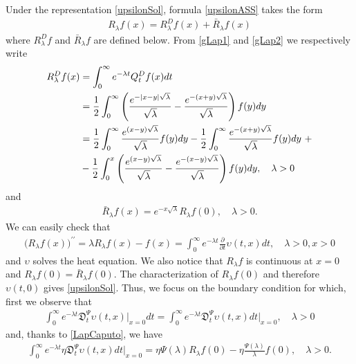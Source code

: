 \documentclass[11pt,a4paper]{article}
\theoremstyle{plain}
\theoremstyle{definition}
\theoremstyle{remark}
\begin{document}
		Under the representation \eqref{upsilonSol}, formula \eqref{upsilonASS} takes the form
		\begin{align*}
			R_\lambda f(x) = R^D_\lambda f(x) + \bar{R}_\lambda f(x)
		\end{align*}
		where $R^D_\lambda f$ and $\bar{R}_\lambda f$ are defined below. From \eqref{gLap1} and \eqref{gLap2} we respectively write
		\begin{align}
			\label{Rtemp}
			R^D_\lambda f(x) 
			& =\int_0^\infty e^{-\lambda t } Q_t^D f(x) dt\notag \\	
			&=\frac{1}{2}\int_0^\infty \left(\frac{e^{-\vert x-y \vert \sqrt \lambda}}{\sqrt \lambda}- \frac{e^{-( x+y)  \sqrt \lambda}}{\sqrt \lambda}\right) f(y) dy\\
			&=\frac{1}{2} \int_0^\infty \frac{e^{( x-y)  \sqrt \lambda}}{\sqrt \lambda} f(y) dy - \frac{1}{2} \int_0^\infty \frac{e^{-( x+y)  \sqrt \lambda}}{\sqrt \lambda} f(y) dy\ +\notag\\
			&- \frac{1}{2} \int_0^x \left(\frac{e^{( x-y)  \sqrt \lambda}}{\sqrt \lambda} - \frac{e^{-( x-y)  \sqrt \lambda}}{\sqrt \lambda} \right) f(y) dy, \quad \lambda>0 \notag
		\end{align}
		and
		\begin{align*}
			\bar{R}_\lambda f(x) = e^{-x \sqrt{\lambda}} R_\lambda f(0), \quad \lambda>0.
		\end{align*}
		We can easily check that
		\begin{align}
			\label{resolvent_heat}
			\big(R_\lambda f(x) \big)^{\prime \prime}= \lambda R_\lambda f(x) - f(x) = \int_0^\infty e^{-\lambda t} \frac{\partial}{\partial t} \upsilon(t, x)dt, \quad \lambda>0, x >0
		\end{align}
		and $\upsilon$ solves the heat equation. We also notice that $R_\lambda f$ is continuous at $x=0$ and $R_\lambda f(0) = \bar{R}_\lambda f(0)$. The characterization of $R_\lambda f(0)$ and therefore $\upsilon(t,0)$ gives \eqref{upsilonSol}. Thus, we focus on the boundary condition for which, first we observe that
		\begin{align*}
			\int_0^\infty e^{-\lambda t} \mathfrak{D}_t^\Psi \upsilon(t,x)\bigg\vert_{x=0} dt  = \int_0^\infty e^{-\lambda t} \mathfrak{D}_t^\Psi \upsilon(t,x) dt \bigg\vert_{x=0}, \quad \lambda>0
		\end{align*}
		and, thanks to \eqref{LapCaputo}, we have
		\begin{align}
			\label{timeBondCond}
			\int_0^\infty e^{-\lambda t} \eta\mathfrak{D}_t^\Psi \upsilon(t,x) dt \bigg\vert_{x=0}= \eta \Psi(\lambda) R_\lambda f(0) - \eta \frac{\Psi(\lambda)}{\lambda} f(0), \quad \lambda>0.
		\end{align}
\end{document}
